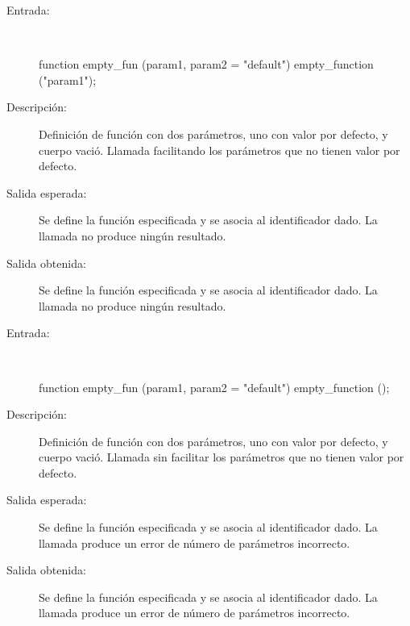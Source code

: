	\begin{description}
		\item [Entrada:] \hfill \\
\begin{myverbatim}
   function empty_fun (param1, param2 = "default") { } 
   empty_function ("param1");
\end{myverbatim}
		\item [Descripción:] Definición de función con dos parámetros, uno con valor por defecto, y cuerpo vació. Llamada facilitando los parámetros que no tienen valor por defecto.
		\item [Salida esperada:] Se define la función especificada y se asocia al identificador dado. La llamada no produce ningún resultado.
		\item [Salida obtenida:] Se define la función especificada y se asocia al identificador dado. La llamada no produce ningún resultado.
	\end{description}

	\begin{description}
		\item [Entrada:] \hfill \\
\begin{myverbatim}
   function empty_fun (param1, param2 = "default") { } 
   empty_function ();
\end{myverbatim}
		\item [Descripción:] Definición de función con dos parámetros, uno con valor por defecto, y cuerpo vació. Llamada sin facilitar los parámetros que no tienen valor por defecto.
		\item [Salida esperada:] Se define la función especificada y se asocia al identificador dado. La llamada produce un error de número de parámetros incorrecto.
		\item [Salida obtenida:] Se define la función especificada y se asocia al identificador dado. La llamada produce un error de número de parámetros incorrecto.
	\end{description}

